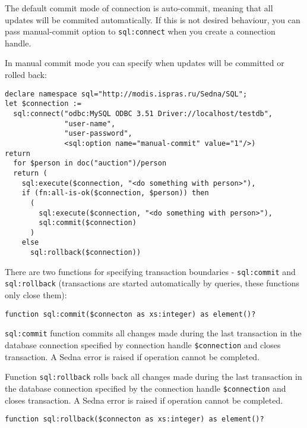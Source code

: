 \documentclass[a4paper,12pt]{article}
\begin{document}
The default commit mode of connection is auto-commit, meaning that all updates
will be commited automatically. If this is not desired behaviour, you can pass
manual-commit option to \verb!sql:connect! when you create a connection handle.

In manual commit mode you can specify when updates will be committed or rolled
back:

\small{
\begin{verbatim}
declare namespace sql="http://modis.ispras.ru/Sedna/SQL";
let $connection :=
  sql:connect("odbc:MySQL ODBC 3.51 Driver://localhost/testdb",
              "user-name",
              "user-password", 
              <sql:option name="manual-commit" value="1"/>)
return
  for $person in doc("auction")/person
  return (
    sql:execute($connection, "<do something with person>"),
    if (fn:all-is-ok($connection, $person)) then
      (
        sql:execute($connection, "<do something with person>"),
        sql:commit($connection)
      )
    else
      sql:rollback($connection))
\end{verbatim}}

There are two functions for specifying transaction boundaries -
\verb!sql:commit! and \verb!sql:rollback! (transactions are started
automatically by queries, these functions only close them):

\begin{verbatim}
function sql:commit($connecton as xs:integer) as element()?
\end{verbatim}

\verb!sql:commit! function commits all changes made during the last transaction
in the database connection specified by connection handle \verb!$connection! and
closes transaction. A Sedna error is raised if operation cannot be completed.

Function \verb!sql:rollback! rolls back all changes made during the last
transaction in the database connection specified by the connection handle
\verb!$connection! and closes transaction. A Sedna error is raised if operation
cannot be completed.

\begin{verbatim}
function sql:rollback($connecton as xs:integer) as element()?
\end{verbatim}


\end{document}

